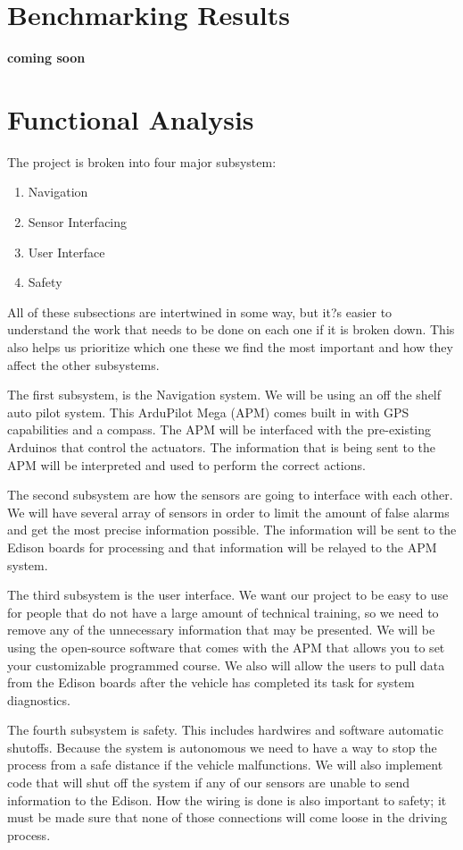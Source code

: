 \section{Benchmarking Results}
	{\bf coming soon}

\section{Functional Analysis}
	The project is broken into four major subsystem:
\begin{enumerate}
	\item Navigation
	\item Sensor Interfacing
	\item User Interface
	\item Safety
\end{enumerate}

All of these subsections are intertwined in some way, but it?s easier to understand the work that needs to be done on each one if it is broken down.  This also helps us prioritize which one these we find the most important and how they affect the other subsystems.

The first subsystem, is the Navigation system.  We will be using an off the shelf auto pilot system.  This ArduPilot Mega (APM) comes built in with GPS capabilities and a compass.  The APM will be interfaced with the pre-existing Arduinos that control the actuators.  The information that is being sent to the APM will be interpreted and used to perform the correct actions. 

The second subsystem are how the sensors are going to interface with each other.  We will have several array of sensors in order to limit the amount of false alarms and get the most precise information possible.  The information will be sent to the Edison boards for processing and that information will be relayed to the APM system.

The third subsystem is the user interface.  We want our project to be easy to use for people that do not have a large amount of technical training, so we need to remove any of the unnecessary information that may be presented.  We will be using the open-source software that comes with the APM that allows you to set your customizable programmed course.  We also will allow the users to pull data from the Edison boards after the vehicle has completed its task for system diagnostics.

The fourth subsystem is safety.  This includes hardwires and software automatic shutoffs.  Because the system is autonomous we need to have a way to stop the process from a safe distance if the vehicle malfunctions.  We will also implement code that will shut off the system if any of our sensors are unable to send information to the Edison.  How the wiring is done is also important to safety; it must be made sure that none of those connections will come loose in the driving process.

